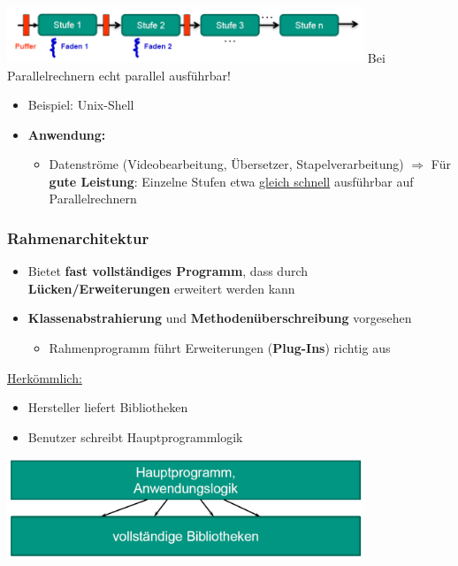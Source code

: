 \begin{center}
\includegraphics[width=0.8\textwidth]{../images/fliessband.png}
Bei Parallelrechnern echt parallel ausführbar!
\end{center}
	
\begin{itemize}
\item Beispiel: Unix-Shell
\item \textbf{Anwendung:}
\begin{itemize}
\item Datenströme (Videobearbeitung, Übersetzer, Stapelverarbeitung)
$\Rightarrow$ Für \textbf{gute Leistung}: Einzelne Stufen etwa \underline{gleich schnell} ausführbar auf Parallelrechnern
\end{itemize}
\end{itemize}
	
\subsubsection{Rahmenarchitektur}
			
\begin{itemize}
\item Bietet \textbf{fast vollständiges Programm}, dass durch \textbf{Lücken/Erweiterungen} erweitert werden kann
\item \textbf{Klassenabstrahierung} und \textbf{Methodenüberschreibung} vorgesehen
\begin{itemize}
\item Rahmenprogramm führt Erweiterungen (\textbf{Plug-Ins}) richtig aus
\end{itemize}
\end{itemize}
			
\underline{Herkömmlich:}
\begin{itemize}
\item Hersteller liefert Bibliotheken
\item Benutzer schreibt Hauptprogrammlogik
\end{itemize}
			
\begin{center}
\includegraphics[width=0.8\textwidth]{../images/rahmenarchitekturHerkoemmlich.png}
\end{center}
				
